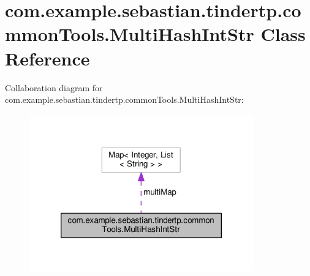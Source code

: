 \hypertarget{classcom_1_1example_1_1sebastian_1_1tindertp_1_1commonTools_1_1MultiHashIntStr}{}\section{com.\+example.\+sebastian.\+tindertp.\+common\+Tools.\+Multi\+Hash\+Int\+Str Class Reference}
\label{classcom_1_1example_1_1sebastian_1_1tindertp_1_1commonTools_1_1MultiHashIntStr}


Collaboration diagram for com.\+example.\+sebastian.\+tindertp.\+common\+Tools.\+Multi\+Hash\+Int\+Str\+:\nopagebreak
\begin{figure}[H]
\begin{center}
\leavevmode
\includegraphics[width=274pt]{classcom_1_1example_1_1sebastian_1_1tindertp_1_1commonTools_1_1MultiHashIntStr__coll__graph}
\end{center}
\end{figure}
